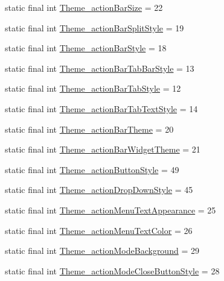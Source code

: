 \begin{DoxyCompactItemize}
\item 
static final int \hyperlink{classcheck_1_1test_1_1_r_1_1styleable_af17d29383b2372457182672f93aeb8e6}{Theme\+\_\+action\+Bar\+Size} = 22
\item 
static final int \hyperlink{classcheck_1_1test_1_1_r_1_1styleable_a9f5d8b45ed85a61b92f887aa336f3adf}{Theme\+\_\+action\+Bar\+Split\+Style} = 19
\item 
static final int \hyperlink{classcheck_1_1test_1_1_r_1_1styleable_a08cd7000f459aa75d7817e7a3a7c3229}{Theme\+\_\+action\+Bar\+Style} = 18
\item 
static final int \hyperlink{classcheck_1_1test_1_1_r_1_1styleable_a4f15c7fba5e3c2d9c43d6e29262b809b}{Theme\+\_\+action\+Bar\+Tab\+Bar\+Style} = 13
\item 
static final int \hyperlink{classcheck_1_1test_1_1_r_1_1styleable_ac7c5d9db6774de90f8feae957a5c9525}{Theme\+\_\+action\+Bar\+Tab\+Style} = 12
\item 
static final int \hyperlink{classcheck_1_1test_1_1_r_1_1styleable_a1733f98ca23b42c6fdd6a6e560392fc2}{Theme\+\_\+action\+Bar\+Tab\+Text\+Style} = 14
\item 
static final int \hyperlink{classcheck_1_1test_1_1_r_1_1styleable_a0c926c0b572d1a456f5181c48e9b6eef}{Theme\+\_\+action\+Bar\+Theme} = 20
\item 
static final int \hyperlink{classcheck_1_1test_1_1_r_1_1styleable_a11aebf359000ff5df5b3cb3760b461ca}{Theme\+\_\+action\+Bar\+Widget\+Theme} = 21
\item 
static final int \hyperlink{classcheck_1_1test_1_1_r_1_1styleable_a15e83ab3003cd39702fb77872405c667}{Theme\+\_\+action\+Button\+Style} = 49
\item 
static final int \hyperlink{classcheck_1_1test_1_1_r_1_1styleable_a1701f361e9f3c65f693656182107e83b}{Theme\+\_\+action\+Drop\+Down\+Style} = 45
\item 
static final int \hyperlink{classcheck_1_1test_1_1_r_1_1styleable_af897628603939c74ea86e5ec3ba329a4}{Theme\+\_\+action\+Menu\+Text\+Appearance} = 25
\item 
static final int \hyperlink{classcheck_1_1test_1_1_r_1_1styleable_a46f47f45868d12945f240329c3a79fe7}{Theme\+\_\+action\+Menu\+Text\+Color} = 26
\item 
static final int \hyperlink{classcheck_1_1test_1_1_r_1_1styleable_a51942708f6a610b1ec0a9c2fca839459}{Theme\+\_\+action\+Mode\+Background} = 29
\item 
static final int \hyperlink{classcheck_1_1test_1_1_r_1_1styleable_ab30e73a8022e0a0d45477373a56e8594}{Theme\+\_\+action\+Mode\+Close\+Button\+Style} = 28

\end{DoxyCompactItemize}
